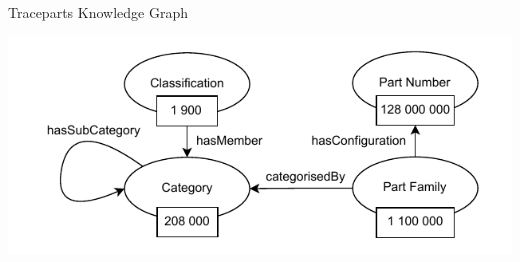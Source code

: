 \begin{frame}{Traceparts Knowledge Graph}

        \begin{center}
            \includegraphics[scale=0.9]{images/tp_kg.pdf} 
        \end{center}

\end{frame}





